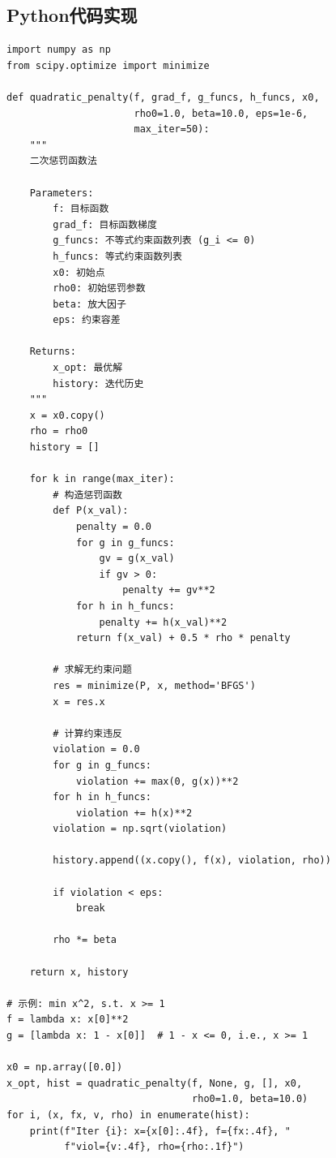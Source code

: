 \subsection{Python代码实现}\label{sec:penalty-code}

\begin{codebox}[二次惩罚法]
\begin{lstlisting}
import numpy as np
from scipy.optimize import minimize

def quadratic_penalty(f, grad_f, g_funcs, h_funcs, x0,
                      rho0=1.0, beta=10.0, eps=1e-6,
                      max_iter=50):
    """
    二次惩罚函数法
    
    Parameters:
        f: 目标函数
        grad_f: 目标函数梯度
        g_funcs: 不等式约束函数列表 (g_i <= 0)
        h_funcs: 等式约束函数列表
        x0: 初始点
        rho0: 初始惩罚参数
        beta: 放大因子
        eps: 约束容差
    
    Returns:
        x_opt: 最优解
        history: 迭代历史
    """
    x = x0.copy()
    rho = rho0
    history = []
    
    for k in range(max_iter):
        # 构造惩罚函数
        def P(x_val):
            penalty = 0.0
            for g in g_funcs:
                gv = g(x_val)
                if gv > 0:
                    penalty += gv**2
            for h in h_funcs:
                penalty += h(x_val)**2
            return f(x_val) + 0.5 * rho * penalty
        
        # 求解无约束问题
        res = minimize(P, x, method='BFGS')
        x = res.x
        
        # 计算约束违反
        violation = 0.0
        for g in g_funcs:
            violation += max(0, g(x))**2
        for h in h_funcs:
            violation += h(x)**2
        violation = np.sqrt(violation)
        
        history.append((x.copy(), f(x), violation, rho))
        
        if violation < eps:
            break
        
        rho *= beta
    
    return x, history

# 示例: min x^2, s.t. x >= 1
f = lambda x: x[0]**2
g = [lambda x: 1 - x[0]]  # 1 - x <= 0, i.e., x >= 1

x0 = np.array([0.0])
x_opt, hist = quadratic_penalty(f, None, g, [], x0,
                                rho0=1.0, beta=10.0)
for i, (x, fx, v, rho) in enumerate(hist):
    print(f"Iter {i}: x={x[0]:.4f}, f={fx:.4f}, "
          f"viol={v:.4f}, rho={rho:.1f}")
\end{lstlisting}
\end{codebox}

